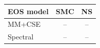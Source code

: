 \renewcommand{\arraystretch}{1.4}
\begin{tabular}{lcc}
    \hline
    EOS model & SMC & NS \\
    \hline
    MM+CSE & -- & -- \\
    Spectral & -- & -- \\
    \hline
\end{tabular}
